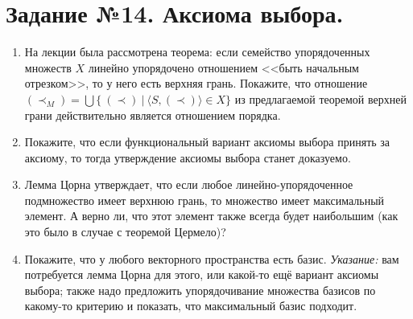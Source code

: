 \documentclass[10pt,a4paper,oneside]{article}
\begin{document}
\section*{Задание №14. Аксиома выбора.}
\begin{enumerate}
\item На лекции была рассмотрена теорема: если семейство упорядоченных множеств $X$ линейно упорядочено отношением 
<<быть начальным отрезком>>, то у него есть верхняя грань. Покажите, что отношение 
$(\prec_M) = \bigcup\{\ (\prec)\ |\ \langle S, (\prec) \rangle \in X\}$ из предлагаемой теоремой 
верхней грани действительно является отношением порядка.

\item Покажите, что если функциональный вариант аксиомы выбора принять за аксиому,
то тогда утверждение аксиомы выбора станет доказуемо.

\item Лемма Цорна утверждает, что если любое линейно-упорядоченное подмножество имеет верхнюю грань, то
множество имеет максимальный элемент. А верно ли, что этот элемент также всегда будет наибольшим (как это было
в случае с теоремой Цермело)?

\item Покажите, что у любого векторного пространства есть базис. \emph{Указание: }вам потребуется лемма Цорна для этого,
или какой-то ещё вариант аксиомы выбора; также надо предложить упорядочивание множества базисов по какому-то критерию и
показать, что максимальный базис подходит.
\end{enumerate}
\end{document}
